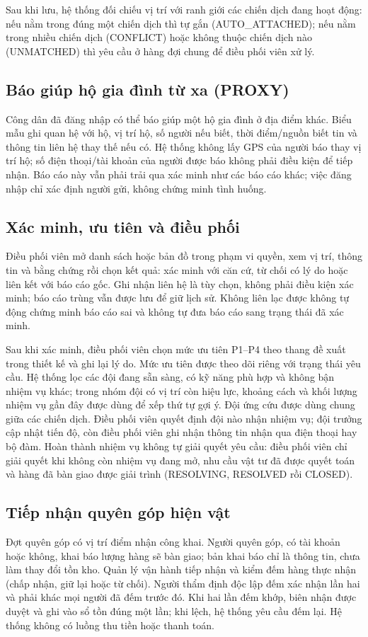 \documentclass[12pt,a4paper,oneside]{report}
\begin{document}
Sau khi lưu, hệ thống đối chiếu vị trí với ranh giới các chiến dịch đang hoạt động: nếu nằm trong đúng một chiến dịch thì tự gắn (AUTO\_ATTACHED); nếu nằm trong nhiều chiến dịch (CONFLICT) hoặc không thuộc chiến dịch nào (UNMATCHED) thì yêu cầu ở hàng đợi chung để điều phối viên xử lý.

\subsection{Báo giúp hộ gia đình từ xa (PROXY)}
Công dân đã đăng nhập có thể báo giúp một hộ gia đình ở địa điểm khác. Biểu mẫu ghi quan hệ với hộ, vị trí hộ, số người nếu biết, thời điểm/nguồn biết tin và thông tin liên hệ thay thế nếu có. Hệ thống không lấy GPS của người báo thay vị trí hộ; số điện thoại/tài khoản của người được báo không phải điều kiện để tiếp nhận. Báo cáo này vẫn phải trải qua xác minh như các báo cáo khác; việc đăng nhập chỉ xác định người gửi, không chứng minh tình huống.

\subsection{Xác minh, ưu tiên và điều phối}
Điều phối viên mở danh sách hoặc bản đồ trong phạm vi quyền, xem vị trí, thông tin và bằng chứng rồi chọn kết quả: xác minh với căn cứ, từ chối có lý do hoặc liên kết với báo cáo gốc. Ghi nhận liên hệ là tùy chọn, không phải điều kiện xác minh; báo cáo trùng vẫn được lưu để giữ lịch sử. Không liên lạc được không tự động chứng minh báo cáo sai và không tự đưa báo cáo sang trạng thái đã xác minh.

Sau khi xác minh, điều phối viên chọn mức ưu tiên P1–P4 theo thang đề xuất trong thiết kế và ghi lại lý do. Mức ưu tiên được theo dõi riêng với trạng thái yêu cầu. Hệ thống lọc các đội đang sẵn sàng, có kỹ năng phù hợp và không bận nhiệm vụ khác; trong nhóm đội có vị trí còn hiệu lực, khoảng cách và khối lượng nhiệm vụ gần đây được dùng để xếp thứ tự gợi ý. Đội ứng cứu được dùng chung giữa các chiến dịch. Điều phối viên quyết định đội nào nhận nhiệm vụ; đội trưởng cập nhật tiến độ, còn điều phối viên ghi nhận thông tin nhận qua điện thoại hay bộ đàm. Hoàn thành nhiệm vụ không tự giải quyết yêu cầu: điều phối viên chỉ giải quyết khi không còn nhiệm vụ đang mở, nhu cầu vật tư đã được quyết toán và hàng đã bàn giao được giải trình (RESOLVING, RESOLVED rồi CLOSED).

\subsection{Tiếp nhận quyên góp hiện vật}
Đợt quyên góp có vị trí điểm nhận công khai. Người quyên góp, có tài khoản hoặc không, khai báo lượng hàng sẽ bàn giao; bản khai báo chỉ là thông tin, chưa làm thay đổi tồn kho. Quản lý vận hành tiếp nhận và kiểm đếm hàng thực nhận (chấp nhận, giữ lại hoặc từ chối). Người thẩm định độc lập đếm xác nhận lần hai và phải khác mọi người đã đếm trước đó. Khi hai lần đếm khớp, biên nhận được duyệt và ghi vào sổ tồn đúng một lần; khi lệch, hệ thống yêu cầu đếm lại. Hệ thống không có luồng thu tiền hoặc thanh toán.
\end{document}
